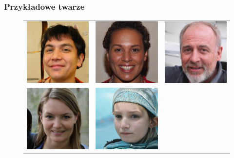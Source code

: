   \subsubsection{Przykładowe twarze}
\begin{figure}[H]
    \begin{center}
    \renewcommand\tabcolsep{1pt}
    \begin{tabular}{ccc}
      \includegraphics[width=.3\linewidth]{img/gen/1.png} &
      \includegraphics[width=.3\linewidth]{img/gen/2.png} &
      \includegraphics[width=.3\linewidth]{img/gen/3.png} \\
      \includegraphics[width=.3\linewidth]{img/gen/4.png} &
      \includegraphics[width=.3\linewidth]{img/gen/5.png} &

\end{tabular}
\end{center}
\end{figure}
